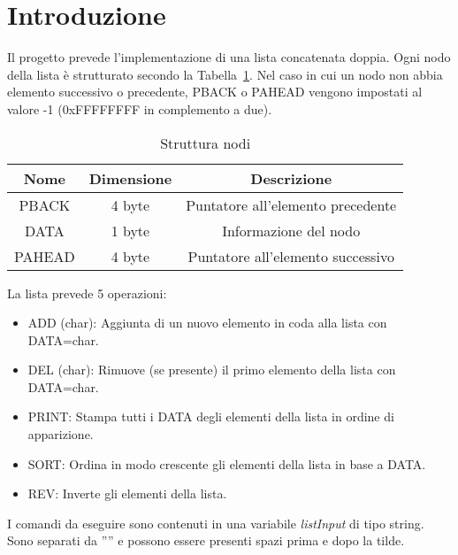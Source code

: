 \section{Introduzione}
Il progetto prevede l'implementazione di una lista concatenata doppia. Ogni nodo 
della lista è strutturato secondo la Tabella~\ref{tab:nodeStructure}. Nel caso in cui un nodo non abbia elemento successivo o precedente, PBACK o PAHEAD 
vengono impostati al valore -1 (0xFFFFFFFF in complemento a due).
\begin{table}[H]
    \begin{center}
    \begin{tabular}{|c|c|c|}
        \hline
        Nome & Dimensione & Descrizione \\
        \hline
        PBACK & 4 byte & Puntatore all'elemento precedente \\
        \hline
        DATA & 1 byte & Informazione del nodo \\
        \hline
        PAHEAD & 4 byte & Puntatore all'elemento successivo \\
        \hline
    \end{tabular}
    \caption{Struttura nodi}
    \label{tab:nodeStructure}
    \end{center}
\end{table}  

La lista prevede 5 operazioni:
\begin{itemize}
    \item ADD (char)\@: Aggiunta di un nuovo elemento in coda alla lista con DATA=char.
    \item DEL (char)\@: Rimuove (se presente) il primo elemento della lista con DATA=char.
    \item PRINT\@: Stampa tutti i DATA degli elementi della lista in ordine di apparizione.
    \item SORT\@: Ordina in modo crescente gli elementi della lista in base a DATA\@.
    \item REV\@: Inverte gli elementi della lista.
\end{itemize}

I comandi da eseguire sono contenuti in una variabile \textit{listInput} di tipo string. 
Sono separati da ''\texttildelow'' e possono essere presenti spazi prima e dopo la tilde.
